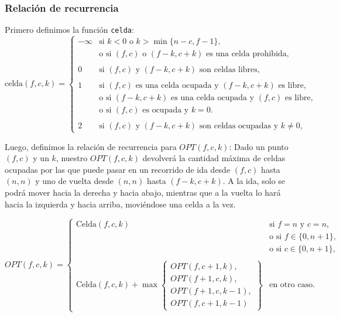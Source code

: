 \subsubsection{Relación de recurrencia}

Primero definimos la función \texttt{celda}:
\[
	\text{celda}(f, c, k) =
	\begin{cases}
		-\infty & \text{si } k < 0 \text{ o } k > \min\{n - c, f - 1\},                            \\
		        & \text{o si } (f, c) \text{ o } (f-k, c+k) \text{ es una celda prohibida},        \\ \\
		0       & \text{si } (f, c) \text{ y } (f-k, c+k) \text{ son celdas libres},               \\  \\
		1       & \text{si } (f, c) \text{ es una celda ocupada y } (f-k, c+k) \text{ es libre},   \\
		        & \text{o si } (f-k, c+k) \text{ es una celda ocupada y } (f, c) \text{ es libre}, \\
		        & \text{o si } (f, c) \text{ es ocupada y } k = 0.                                 \\ \\
		2       & \text{si } (f, c) \text{ y } (f-k, c+k) \text{ son celdas ocupadas y } k \neq 0,
	\end{cases}
\]


Luego, definimos la relación de recurrencia para $OPT(f, c, k)$:
Dado un punto $(f, c)$ y un $k$, nuestro $OPT(f, c, k)$ devolverá la cantidad máxima de celdas ocupadas por las que puede pasar en un recorrido de ida desde $(f, c)$
hasta $(n, n)$ y uno de vuelta desde $(n, n)$ hasta $(f - k, c + k)$. A la ida, solo se podrá mover hacia la derecha y hacia abajo, mientras que a la vuelta lo hará
hacia la izquierda y hacia arriba, moviéndose una celda a la vez.

\[
	OPT(f, c, k) =
	\begin{cases}
		\text{Celda}(f, c, k) & \text{si } f = n \text{ y } c = n, \\
		                      & \text{o si } f \in \{0, n+1\},     \\
		                      & \text{o si } c \in \{0, n+1\},     \\ \\
		\text{Celda}(f, c, k) + \max\left\{
		\begin{array}{l}
			OPT(f, c+1, k),   \\
			OPT(f+1, c, k),   \\
			OPT(f+1, c, k-1), \\
			OPT(f, c+1, k-1)
		\end{array}
		\right\}              & \text{en otro caso}.
	\end{cases}
\]